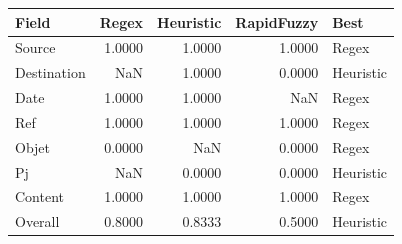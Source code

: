 \begin{tabular}{lrrrl}
\toprule
Field & Regex & Heuristic & RapidFuzzy & Best \\
\midrule
Source & 1.0000 & 1.0000 & 1.0000 & Regex \\
Destination & NaN & 1.0000 & 0.0000 & Heuristic \\
Date & 1.0000 & 1.0000 & NaN & Regex \\
Ref & 1.0000 & 1.0000 & 1.0000 & Regex \\
Objet & 0.0000 & NaN & 0.0000 & Regex \\
Pj & NaN & 0.0000 & 0.0000 & Heuristic \\
Content & 1.0000 & 1.0000 & 1.0000 & Regex \\
Overall & 0.8000 & 0.8333 & 0.5000 & Heuristic \\
\bottomrule
\end{tabular}
